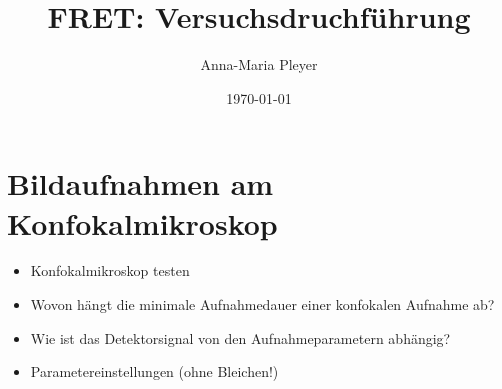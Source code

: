 \documentclass[a4paper, twoside]{article}
\begin{document}
\title{FRET: Versuchsdruchführung}
\author{Anna-Maria Pleyer}
\date{\today}
\maketitle
\section{Bildaufnahmen am Konfokalmikroskop}
 \begin{itemize}
     \item Konfokalmikroskop testen
     \item Wovon hängt die minimale Aufnahmedauer einer konfokalen Aufnahme ab?
     \item Wie ist das Detektorsignal von den Aufnahmeparametern abhängig?
     \item Parametereinstellungen (ohne Bleichen!)
 \end{itemize}
\end{document}
